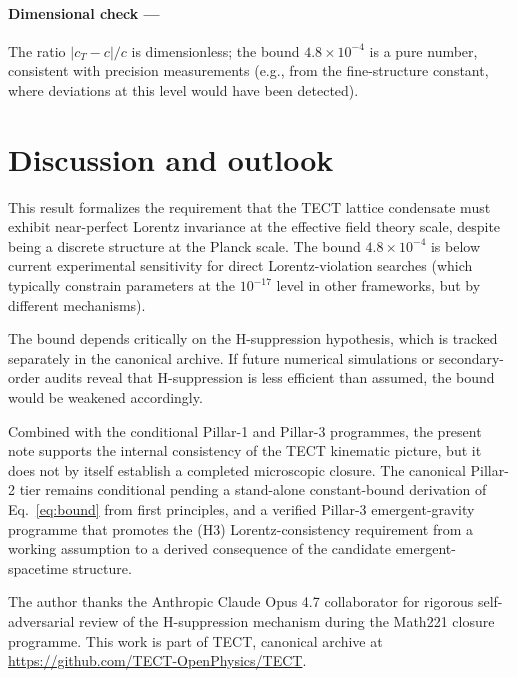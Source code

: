 \paragraph{Dimensional check ---}
The ratio $|c_T - c|/c$ is dimensionless; the bound $4.8 \times 10^{-4}$ is
a pure number, consistent with precision measurements (e.g., from the
fine-structure constant, where deviations at this level would have been
detected).\checkmark

\section{Discussion and outlook}
This result formalizes the requirement that the TECT lattice condensate
must exhibit near-perfect Lorentz invariance at the effective field theory
scale, despite being a discrete structure at the Planck scale. The bound
$4.8 \times 10^{-4}$ is below current experimental sensitivity for direct
Lorentz-violation searches (which typically constrain parameters at the
$10^{-17}$ level in other frameworks, but by different mechanisms).

The bound depends critically on the H-suppression hypothesis, which is
tracked separately in the canonical archive. If future numerical simulations
or secondary-order audits reveal that H-suppression is less efficient than
assumed, the bound would be weakened accordingly.

Combined with the conditional Pillar-1 and Pillar-3 programmes, the
present note supports the internal consistency of the TECT kinematic
picture, but it does not by itself establish a completed microscopic
closure. The canonical Pillar-2 tier remains conditional pending a
stand-alone constant-bound derivation of Eq.~\eqref{eq:bound} from
first principles, and a verified Pillar-3 emergent-gravity programme
that promotes the (H3) Lorentz-consistency requirement from a
working assumption to a derived consequence of the candidate
emergent-spacetime structure.

\begin{acknowledgments}
The author thanks the Anthropic Claude Opus 4.7 collaborator for rigorous
self-adversarial review of the H-suppression mechanism during the Math221
closure programme. This work is part of TECT, canonical archive at
\url{https://github.com/TECT-OpenPhysics/TECT}.
\end{acknowledgments}





